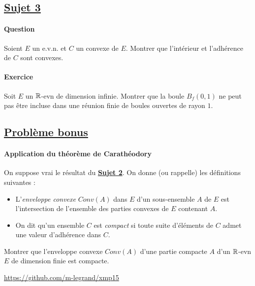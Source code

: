 \documentclass[12pt,a4paper]{report}
\begin{document}
\subsection*{\underline{Sujet 3}}

\paragraph*{Question} %
Soient $E$ un e.v.n. et $C$ un convexe de $E$. Montrer que l'intérieur et l'adhérence de $C$ sont convexes.

\paragraph*{Exercice} %
Soit $E$ un $\mathbb{R}$-evn de dimension infinie.  Montrer que la boule $B_f(0,1)$ ne peut pas être incluse dans une réunion finie de boules ouvertes de rayon $1$.

\subsection*{\underline{Problème bonus}} %

\paragraph*{Application du théorème de Carathéodory}
On suppose vrai le résultat du \textbf{\underline{Sujet 2}}. 
On donne (ou rappelle) les définitions suivantes :
\begin{itemize}
\item L'\emph{enveloppe convexe} $Conv(A)$ dans $E$ d'un sous-ensemble $A$ de $E$ est l'intersection de l'ensemble des parties convexes de $E$ contenant $A$.
\item On dit qu'un ensemble $C$ est \emph{compact} si toute suite d'éléments de $C$ admet une valeur d'adhérence dans $C$.
\end{itemize}
Montrer que l'enveloppe convexe $Conv(A)$ d'une partie compacte $A$ d'un $\mathbb{R}$-evn $E$ de dimension finie est compacte.
\vfill

\begin{center}
\url{https://github.com/m-legrand/xmp15}
\end{center}
\end{document}
